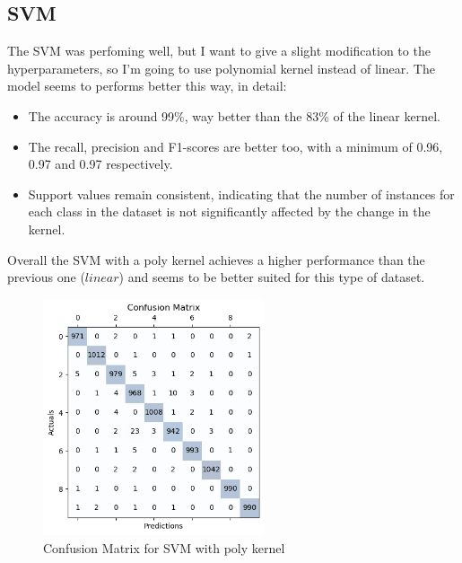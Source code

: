 \documentclass{article}
\begin{document}
\begin{titlepage}
  \section{SVM}
  The SVM was perfoming well, but I want to give a slight modification to the hyperparameters, so I'm going to use polynomial kernel instead of linear.
  \newline
  \newline
  The model seems to performs better this way, in detail:

  \begin{itemize}
    \item The accuracy is around 99\%, way better than the 83\% of the linear kernel.
    \item The recall, precision and F1-scores are better too, with a minimum of 0.96, 0.97 and 0.97 respectively.
    \item Support values remain consistent, indicating that the number of instances for each class in the dataset is not significantly affected by the change in the kernel.
  \end{itemize}

  Overall the SVM with a poly kernel achieves a higher performance than the previous one ($linear$) and seems to be better suited for this type of dataset.
  \newline
  \newline

  \begin{figure}[htbp]
    \centering
    \includegraphics[width=0.58\textwidth]{SVM2CM.png}
    \caption{Confusion Matrix for SVM with poly kernel}
    \label{fig:sample5}
  \end{figure}

  \newpage


\end{titlepage}
\end{document}
